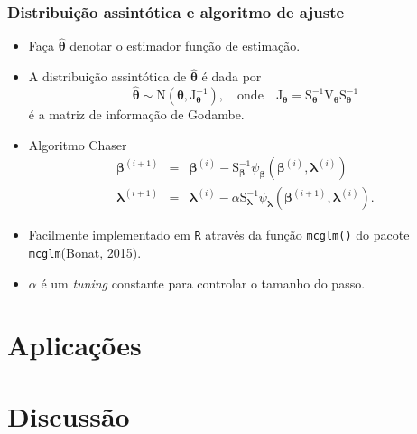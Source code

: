 \documentclass[10pt, aspectratio=169]{beamer}\usepackage[]{graphicx}\usepackage[]{color}
\begin{document}
\begin{frame}[c]
\frametitle{Distribuição assintótica e algoritmo de ajuste}
\begin{itemize}
\item Faça $\boldsymbol{\hat{\theta}}$ denotar o estimador função de estimação.
\item A distribuição assintótica de $\boldsymbol{\hat{\theta}}$ é dada por 
\begin{equation*}
\boldsymbol{\hat{\theta}} \sim \mathrm{N}(\boldsymbol{\theta}, \mathrm{J}_{\boldsymbol{\theta}}^{-1}), \quad
\text{onde} \quad
\mathrm{J}_{\boldsymbol{\theta}} =  \mathrm{S}_{\boldsymbol{\theta}}^{-1}\mathrm{V}_{\boldsymbol{\theta}}\mathrm{S}_{\boldsymbol{\theta}}^{-1}
\end{equation*}
é a matriz de informação de Godambe.
\item Algoritmo Chaser
\begin{eqnarray*}
\label{chaser}
\boldsymbol{\beta}^{(i+1)} &=& \boldsymbol{\beta}^{(i)} - \mathrm{S}_{\boldsymbol{\beta}}^{-1} \psi_{\boldsymbol{\beta}}(\boldsymbol{\beta}^{(i)}, \boldsymbol{\lambda}^{(i)}) \nonumber \\
\boldsymbol{\lambda}^{(i+1)} &=& \boldsymbol{\lambda}^{(i)} - \alpha \mathrm{S}_{\boldsymbol{\lambda}}^{-1} \psi_{\boldsymbol{\lambda}}(\boldsymbol{\beta}^{(i+1)}, \boldsymbol{\lambda}^{(i)}).
\end{eqnarray*}
\item Facilmente implementado em \texttt{R} através da função \texttt{mcglm()}
do pacote \texttt{mcglm}(Bonat, 2015).
\item $\alpha$ é um \textit{tuning} constante para controlar o tamanho do passo.
\end{itemize}
\end{frame}

\section{Aplicações}
\label{Section5}


\section{Discussão}
\label{Section6}

\end{document}
